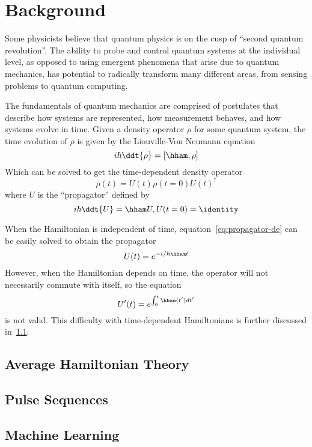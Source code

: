\chapter{Background}


Some physicists believe that quantum physics is on the cusp of ``second quantum revolution''\cite{quantum-rev}. The ability to probe and control quantum systems at the individual level, as opposed to using emergent phenomena that arise due to quantum mechanics, has potential to radically transform many different areas, from sensing problems to quantum computing.

The fundamentals of quantum mechanics are comprised of postulates that describe how systems are represented, how measurement behaves, and how systems evolve in time.
Given a density operator $\rho$ for some quantum system, the time evolution of $\rho$ is given by the Liouville-Von Neumann equation
\begin{equation}
    i\hbar \ddt{\rho} = [\hham, \rho]
\end{equation}
Which can be solved to get the time-dependent density operator
\begin{equation}\label{eq:density-time}
    \rho(t) = U(t) \rho(t=0) U(t)^\dagger
\end{equation}
where $U$ is the ``propagator'' defined by
\begin{equation}\label{eq:propagator-de}
    i\hbar \ddt{U} = \hham U, U(t=0) = \identity
\end{equation}

When the Hamiltonian is independent of time, equation~\ref{eq:propagator-de} can be easily solved to obtain the propagator
\[
U(t) = e^{-i/\hbar \hham t}
\]
However, when the Hamiltonian depends on time, the operator will not necessarily commute with itself, so the equation
\[
U'(t) = e^{\int_0^t \hham(t') dt'}
\]
is not valid. This difficulty with time-dependent Hamiltonians is further discussed in~\ref{sec:AHT}.



\section{Average Hamiltonian Theory}\label{sec:AHT}


\section{Pulse Sequences}


\section{Machine Learning}

